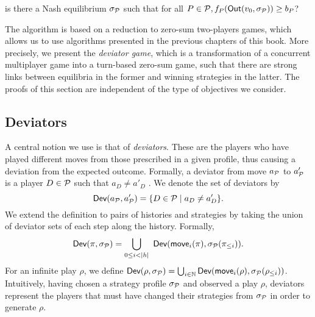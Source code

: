 %
{is there a Nash equilibrium $\sigma_{\mathcal{P}}$ such that for all
$P \in \mathcal{P}, f_P(\textsf{Out}({v_0,\sigma_{\mathcal{P}}})) \ge b_P$?}

The algorithm is based on a reduction to zero-sum two-players games,
which allows us to use algorithms presented in the previous chapters of
this book. More precisely, we present the \emph{deviator game}, which is
a transformation of a concurrent multiplayer game into a turn-based
zero-sum game, such that there are strong links between equilibria in
the former and winning strategies in the latter. The proofs of
this section are independent of the type of objectives we consider.

\subsection{Deviators}
\label{13-subsection:deviators}

A central notion we use is that of \emph{deviators}. These are the
players who have played different moves from those prescribed in a given
profile, thus causing a deviation from the expected outcome. Formally, a
deviator from move
\(a_{\mathcal{P}}\) to \(a'_{\mathcal{P}}\) is a player
\(D \in \mathcal{P}\) such that \(a_D \ne a'_D\) . We denote the set of
deviators by \[
        \textsf{Dev}(a_{\mathcal{P}} , a'_{\mathcal{P}} ) = \{D \in \mathcal{P} \mid a_D \ne a'_D \}.
\] We extend the definition to pairs of histories and strategies by
taking the union of deviator sets of each step along the history.
Formally,
\[
\textsf{Dev}(\pi, \sigma_{\mathcal{P}}) = \bigcup_{0\le i < |h|}~ \textsf{Dev}(\textsf{move}_i(\pi), \sigma_{\mathcal{P}}(\pi_{\le i})).
\]
For an infinite play \(\rho\), we define
\(\textsf{Dev}(\rho, \sigma_{\mathcal{P}} ) = \bigcup_{i \in \mathbb{N}} \textsf{Dev}(\textsf{move}_i(\rho), \sigma_{\mathcal{P}}(\rho_{\le i} ))\).
Intuitively, having chosen a strategy profile \(\sigma_{\mathcal{P}}\) and
observed a play \(\rho\), deviators represent the players that must have
changed their strategies from \(\sigma_{\mathcal{P}}\) in order to generate
\(\rho\).

